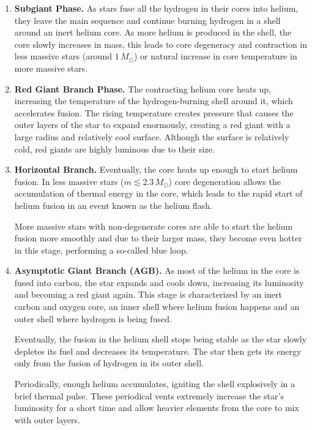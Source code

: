 \begin{enumerate}
    \item \textbf{Subgiant Phase.}  As stars fuse all the hydrogen in their cores into helium, they leave the main sequence and continue burning hydrogen in a shell around an inert helium core.
    As more helium is produced in the shell, the core slowly increases in mass, this leads to core degeneracy and contraction in less massive stars (around $1 \, M_{\odot}$) or natural increase in core temperature in more massive stars. \parencite{Renzini1981}

    \item \textbf{Red Giant Branch Phase.} The contracting helium core heats up, increasing the temperature of the hydrogen-burning shell around it, which accelerates fusion.
    The rising temperature creates pressure that causes the outer layers of the star to expand enormously, creating a red giant with a large radius and relatively cool surface.
    Although the surface is relatively cold, red giants are highly luminous due to their size. \parencite{Aguirre2017}

    \item\label{item:02-horiozntal-branch}\textbf{Horizontal Branch.} Eventually, the core heats up enough to start helium fusion.
    In less massive stars ($m \lesssim 2.3 \, M_{\odot}$) core degeneration allows the accumulation of thermal energy in the core, which leads to the rapid start of helium fusion in an event known as the helium flash.

    More massive stars with non-degenerate cores are able to start the helium fusion more smoothly and due to their larger mass, they become even hotter in this stage, performing a so-called blue loop. \parencite{Renzini1981}

    \item \textbf{Asymptotic Giant Branch (AGB).} As most of the helium in the core is fused into carbon, the star expands and cools down, increasing its luminosity and becoming a red giant again.
    This stage is characterized by an inert carbon and oxygen core, an inner shell where helium fusion happens and an outer shell where hydrogen is being fused.

    Eventually, the fusion in the helium shell stops being stable as the star slowly depletes its fuel and decreases its temperature.
    The star then gets its energy only from the fusion of hydrogen in its outer shell.

    Periodically, enough helium accumulates, igniting the shell explosively in a brief thermal pulse.
    These periodical vents extremely increase the star's luminosity for a short time and allow heavier elements from the core to mix with outer layers.


\end{enumerate}
